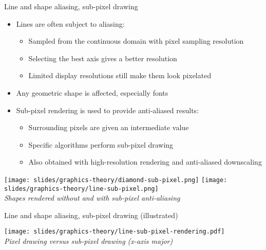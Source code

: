 \begin{frame}{Line and shape aliasing, sub-pixel drawing}
  \begin{itemize}
  \item Lines are often subject to aliasing:
    \begin{itemize}
    \item Sampled from the continuous domain with pixel sampling resolution
    \item Selecting the best axis gives a better resolution
    \item Limited display resolutions still make them look pixelated
    \end{itemize}
  \item Any geometric shape is affected, especially fonts
  \item Sub-pixel rendering is used to provide anti-aliased results:
    \begin{itemize}
    \item Surrounding pixels are given an intermediate value
    \item Specific algorithms perform sub-pixel drawing
    \item Also obtained with high-resolution rendering and anti-aliased downscaling
    \end{itemize}
  \end{itemize}

  \begin{center}
  \texttt{[image: slides/graphics-theory/diamond-sub-pixel.png]}
  \texttt{[image: slides/graphics-theory/line-sub-pixel.png]}\\
  \textit{\small Shapes rendered without and with sub-pixel anti-aliasing}
  \end{center}
\end{frame}

\begin{frame}{Line and shape aliasing, sub-pixel drawing (illustrated)}
  \begin{center}
  \texttt{[image: slides/graphics-theory/line-sub-pixel-rendering.pdf]}\\
  \textit{\small Pixel drawing versus sub-pixel drawing (x-axis major)}
  \end{center}
\end{frame}

